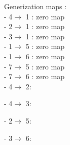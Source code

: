 Generization maps : \\
- 4$\rightarrow$ 1 : zero map \\
- 2$\rightarrow$ 1 : zero map \\
- 3$\rightarrow$ 1 : zero map \\
- 1$\rightarrow$ 5 : zero map \\
- 1$\rightarrow$ 6 : zero map \\
- 7$\rightarrow$ 5 : zero map \\
- 7$\rightarrow$ 6 : zero map \\
- 4$\rightarrow$ 2: 

- 4$\rightarrow$ 3: 

- 2$\rightarrow$ 5: 

- 3$\rightarrow$ 6: 

